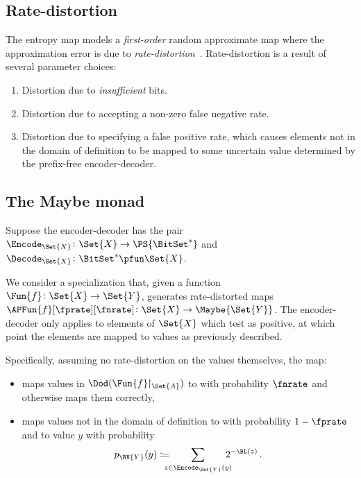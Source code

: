 \documentclass[ ../main.tex]{subfiles}
\begin{document}
\subsection{Rate-distortion}
\label{sec:entropy-rate-distortion}

The entropy map models a \emph{first-order} random approximate map where the approximation error is due to \emph{rate-distortion}~\cite{shannon1959,cover2006}.
Rate-distortion is a result of several parameter choices:
\begin{enumerate}
	\item\label{itm:insufficient} Distortion due to \emph{insufficient} bits.
	\item\label{itm:fnr} Distortion due to accepting a non-zero false negative rate.
	\item Distortion due to specifying a false positive rate, which causes elements not in the domain of definition to be mapped to some uncertain value determined by the prefix-free encoder-decoder.
\end{enumerate}

\subsection{The Maybe monad}
\label{sec:maybe-monad}

Suppose the encoder-decoder has the pair $\Encode_{\Set{X}} \colon \Set{X} \to \PS{\BitSet^*}$ and $\Decode_{\Set{X}} \colon \BitSet^* \pfun \Set{X}$.

We consider a specialization that, given a function $\Fun{f} \colon \Set{X} \to \Set{Y}$, generates rate-distorted maps $\APFun{f}[\fprate][\fnrate] \colon \Set{X} \to \Maybe{\Set{Y}}$.
The encoder-decoder only applies to elements of $\Set{X}$ which test as positive, at which point the elements are mapped to values as previously described.

Specifically, assuming no rate-distortion on the values themselves, the map:
\begin{itemize}
\item maps values in $\Dod(\Fun{f}\!\!\restriction_{\Set{A}})$ to \Nothing with probability $\fnrate$ and otherwise maps them correctly,
\item maps values not in the domain of definition to \Nothing with probability $1-\fprate$ and to value $y$ with probability
\begin{equation}
\label{eq:fp-value-dist}
	p_{\RV{Y}}(y) \coloneqq \!\!\!\!\! \sum_{z \in \Encode_{\Set{Y}}(y)} \!\!\!\!\! 2^{-\BL(z)}\,.
\end{equation}
\end{itemize}
\end{document}
